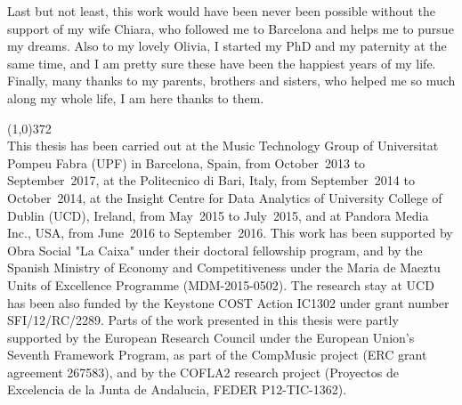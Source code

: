 Last but not least, this work would have been never been possible without the support of my wife Chiara, who followed me to Barcelona and helps me to pursue my dreams. Also to my lovely Olivia, I started my PhD and my paternity at the same time, and I am pretty sure these have been the happiest years of my life. Finally, many thanks to my parents, brothers and sisters, who helped me so much along my whole life, I am here thanks to them.

\vspace*{\fill}

\line(1,0){372}\\
\footnotesize
This thesis has been carried out at the Music Technology Group of Universitat Pompeu Fabra (UPF) in Barcelona, Spain, from October~2013 to September~2017, at the Politecnico di Bari, Italy, from September~2014 to October~2014, at the Insight Centre for Data Analytics of University College of Dublin (UCD), Ireland, from May~2015 to July~2015, and at Pandora Media Inc., USA, from June~2016 to September~2016. This work has been supported by Obra Social "La Caixa" under their doctoral fellowship program, and by the Spanish Ministry of Economy and Competitiveness under the Maria de Maeztu Units of Excellence Programme (MDM-2015-0502). The research stay at UCD has been also funded by the Keystone COST Action IC1302 under grant number SFI/12/RC/2289. Parts of the work presented in this thesis were partly supported by the European Research Council under the European Union's Seventh Framework Program, as part of the CompMusic project (ERC grant agreement 267583), and by the COFLA2 research project (Proyectos de Excelencia de la Junta de Andalucia, FEDER P12-TIC-1362).
\normalsize